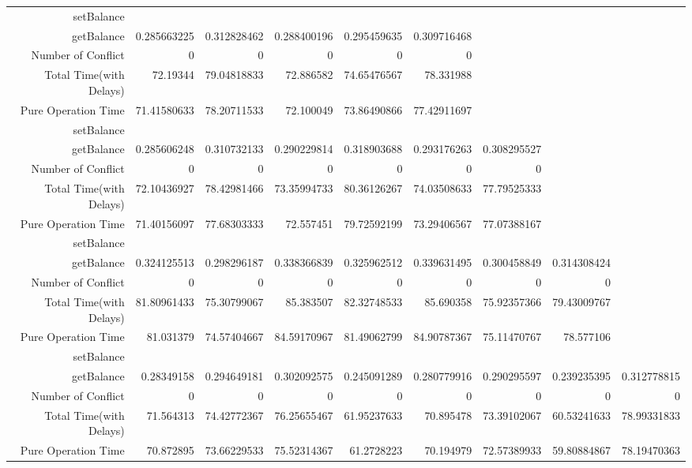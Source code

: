 \begin{landscape}
\begin{table}[htbp]
\begin{tabular}{rrrrrrrrr}
\cline{1-9}    
    setBalance &       &       &       &       &       &       &       &  \\
    getBalance & 0.285663225 & 0.312828462 & 0.288400196 & 0.295459635 & 0.309716468 &       &       &  \\
    Number of Conflict & 0     & 0     & 0     & 0     & 0     &       &       &  \\
    Total Time(with Delays) & 72.19344 & 79.04818833 & 72.886582 & 74.65476567 & 78.331988 &       &       &  \\
    Pure Operation Time & 71.41580633 & 78.20711533 & 72.100049 & 73.86490866 & 77.42911697 &       &       &  \\
\cline{1-9}    
    setBalance &       &       &       &       &       &       &       &  \\
    getBalance & 0.285606248 & 0.310732133 & 0.290229814 & 0.318903688 & 0.293176263 & 0.308295527 &       &  \\
    Number of Conflict & 0     & 0     & 0     & 0     & 0     & 0     &       &  \\
    Total Time(with Delays) & 72.10436927 & 78.42981466 & 73.35994733 & 80.36126267 & 74.03508633 & 77.79525333 &       &  \\
    Pure Operation Time & 71.40156097 & 77.68303333 & 72.557451 & 79.72592199 & 73.29406567 & 77.07388167 &       &  \\
\cline{1-9}    
    setBalance &       &       &       &       &       &       &       &  \\
    getBalance & 0.324125513 & 0.298296187 & 0.338366839 & 0.325962512 & 0.339631495 & 0.300458849 & 0.314308424 &  \\
    Number of Conflict & 0     & 0     & 0     & 0     & 0     & 0     & 0     &  \\
    Total Time(with Delays) & 81.80961433 & 75.30799067 & 85.383507 & 82.32748533 & 85.690358 & 75.92357366 & 79.43009767 &  \\
    Pure Operation Time & 81.031379 & 74.57404667 & 84.59170967 & 81.49062799 & 84.90787367 & 75.11470767 & 78.577106 &  \\
\cline{1-9}    
    setBalance &       &       &       &       &       &       &       &  \\
    getBalance & 0.28349158 & 0.294649181 & 0.302092575 & 0.245091289 & 0.280779916 & 0.290295597 & 0.239235395 & 0.312778815 \\
    Number of Conflict & 0     & 0     & 0     & 0     & 0     & 0     & 0     & 0 \\
    Total Time(with Delays) & 71.564313 & 74.42772367 & 76.25655467 & 61.95237633 & 70.895478 & 73.39102067 & 60.53241633 & 78.99331833 \\
    Pure Operation Time & 70.872895 & 73.66229533 & 75.52314367 & 61.2728223 & 70.194979 & 72.57389933 & 59.80884867 & 78.19470363 \\
    \bottomrule
    \end{tabular}%
  \label{tab:reads Cache}%
\end{table}%
\end{landscape}


